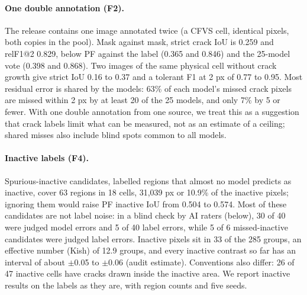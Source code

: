 \paragraph{One double annotation (F2).} The release contains one image annotated twice (a CFVS cell, identical pixels, both copies in
the pool). Mask against mask, strict crack IoU is 0.259 and relF1@2 0.829, below PF against the label (0.365 and 0.846) and the
25-model vote (0.398 and 0.868). Two images of the same physical cell without crack growth give strict IoU 0.16 to 0.37 and a
tolerant F1 at 2 px of 0.77 to 0.95. Most residual error is shared by the models: 63\% of each model's missed crack pixels are missed within 2 px
by at least 20 of the 25 models, and only 7\% by 5 or fewer. With one double annotation from one source, we treat this as a
suggestion that crack labels limit what can be measured, not as an estimate of a ceiling; shared misses also include blind spots
common to all models.

\paragraph{Inactive labels (F4).} Spurious-inactive candidates, labelled regions that almost no model predicts as inactive, cover
63 regions in 18 cells, 31,039 px or 10.9\% of the inactive pixels; ignoring them would raise PF inactive IoU from 0.504 to 0.574.
Most of these candidates are not label noise: in a blind check by AI raters (below), 30 of 40 were judged model errors and 5 of 40 label
errors, while 5 of 6 missed-inactive candidates were judged label errors. Inactive pixels sit in 33 of the 285 groups, an effective
number (Kish) of 12.9 groups, and every inactive contrast so far has an interval of about $\pm$0.05 to $\pm$0.06 (audit estimate). Conventions also
differ: 26 of 47 inactive cells have cracks drawn inside the inactive area. We report inactive results on the labels as they are,
with region counts and five seeds.

